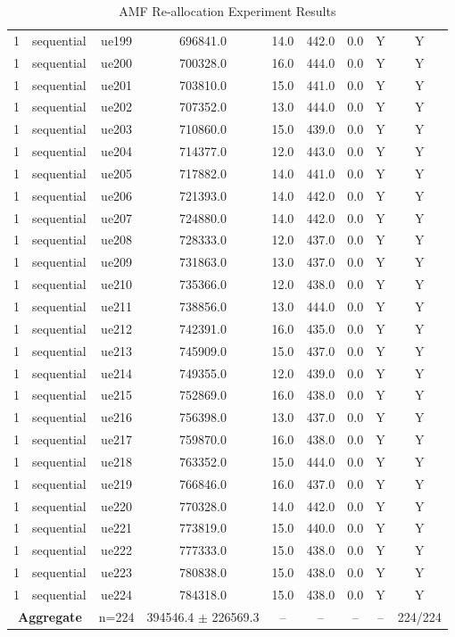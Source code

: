 \begin{table}[ht]
\begin{tabular}{|c|c|c|c|c|c|c|c|c|}
1 & sequential & ue199 & 696841.0 & 14.0 & 442.0 & 0.0 & Y & Y \\
1 & sequential & ue200 & 700328.0 & 16.0 & 444.0 & 0.0 & Y & Y \\
1 & sequential & ue201 & 703810.0 & 15.0 & 441.0 & 0.0 & Y & Y \\
1 & sequential & ue202 & 707352.0 & 13.0 & 444.0 & 0.0 & Y & Y \\
1 & sequential & ue203 & 710860.0 & 15.0 & 439.0 & 0.0 & Y & Y \\
1 & sequential & ue204 & 714377.0 & 12.0 & 443.0 & 0.0 & Y & Y \\
1 & sequential & ue205 & 717882.0 & 14.0 & 441.0 & 0.0 & Y & Y \\
1 & sequential & ue206 & 721393.0 & 14.0 & 442.0 & 0.0 & Y & Y \\
1 & sequential & ue207 & 724880.0 & 14.0 & 442.0 & 0.0 & Y & Y \\
1 & sequential & ue208 & 728333.0 & 12.0 & 437.0 & 0.0 & Y & Y \\
1 & sequential & ue209 & 731863.0 & 13.0 & 437.0 & 0.0 & Y & Y \\
1 & sequential & ue210 & 735366.0 & 12.0 & 438.0 & 0.0 & Y & Y \\
1 & sequential & ue211 & 738856.0 & 13.0 & 444.0 & 0.0 & Y & Y \\
1 & sequential & ue212 & 742391.0 & 16.0 & 435.0 & 0.0 & Y & Y \\
1 & sequential & ue213 & 745909.0 & 15.0 & 437.0 & 0.0 & Y & Y \\
1 & sequential & ue214 & 749355.0 & 12.0 & 439.0 & 0.0 & Y & Y \\
1 & sequential & ue215 & 752869.0 & 16.0 & 438.0 & 0.0 & Y & Y \\
1 & sequential & ue216 & 756398.0 & 13.0 & 437.0 & 0.0 & Y & Y \\
1 & sequential & ue217 & 759870.0 & 16.0 & 438.0 & 0.0 & Y & Y \\
1 & sequential & ue218 & 763352.0 & 15.0 & 444.0 & 0.0 & Y & Y \\
1 & sequential & ue219 & 766846.0 & 16.0 & 437.0 & 0.0 & Y & Y \\
1 & sequential & ue220 & 770328.0 & 14.0 & 442.0 & 0.0 & Y & Y \\
1 & sequential & ue221 & 773819.0 & 15.0 & 440.0 & 0.0 & Y & Y \\
1 & sequential & ue222 & 777333.0 & 15.0 & 438.0 & 0.0 & Y & Y \\
1 & sequential & ue223 & 780838.0 & 15.0 & 438.0 & 0.0 & Y & Y \\
1 & sequential & ue224 & 784318.0 & 15.0 & 438.0 & 0.0 & Y & Y \\
\multicolumn{2}{|c|}{\textbf{Aggregate}} & n=224 & 394546.4 $\pm$ 226569.3 & -- & -- & -- & -- & 224/224 \\
\hline
\end{tabular}
\caption{AMF Re-allocation Experiment Results}
\label{tab:amf_realloc}
\end{table}
